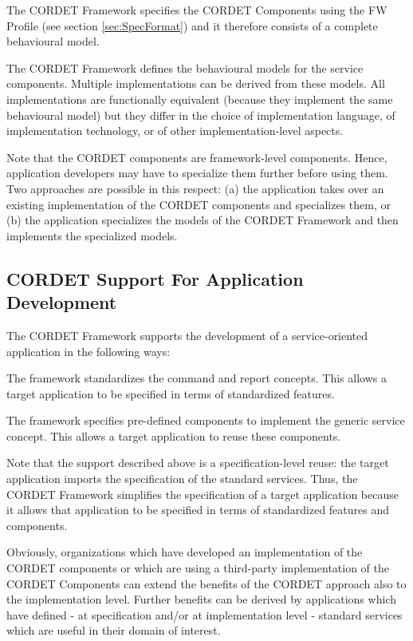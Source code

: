 \documentclass[a4paper,10pt]{article}
\newenvironment{fw_enumerate}					%
{\begin{enumerate}
  \setlength{\itemsep}{1mm}
  \setlength{\parskip}{0pt}
  \setlength{\parsep}{0pt}}
{\end{enumerate}}
\begin{document}
The CORDET Framework specifies the CORDET Components using the FW Profile (see section \ref{sec:SpecFormat}) and it therefore consists of a complete behavioural model.  

The CORDET Framework defines the behavioural models for the service components. Multiple implementations can be derived from these models. All implementations are functionally equivalent (because they implement the same behavioural model) but they differ in the choice of implementation language, of implementation technology, or of other implementation-level aspects. 

Note that the CORDET components are framework-level components. Hence, application developers may have to specialize them further before using them. Two approaches are possible in this respect: (a) the application takes over an existing implementation of the CORDET components and specializes them, or (b) the application specializes the models of the CORDET Framework and then implements the specialized models.

\subsection{CORDET Support For Application Development}\label{sec:CrSupportForAppDev} 

The CORDET Framework supports the development of a service-oriented application in the following ways:

\begin{fw_enumerate}
\item{} The framework standardizes the command and report concepts. 
This allows a target application to be specified in terms of standardized features.  
\item{} The framework specifies pre-defined components to implement the generic service concept. 
This allows a target application to reuse these components.  
\end{fw_enumerate}

Note that the support described above is a specification-level reuse: the target application imports the specification of the standard services. 
Thus, the CORDET Framework simplifies the specification of a target application because it allows that application to be specified in terms of standardized features and components.

Obviously, organizations which have developed an implementation of the CORDET components or which are using a third-party implementation of the CORDET Components can extend the benefits of the CORDET approach also to the implementation level. Further benefits can be derived by applications which have defined - at specification and/or at implementation level - standard services which are useful in their domain of interest.
\end{document}
